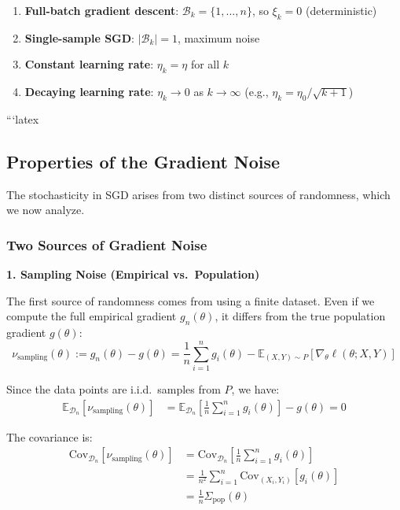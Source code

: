 \documentclass[11pt]{article}
\begin{document}
\begin{enumerate}
    \item \textbf{Full-batch gradient descent}: $\mathcal{B}_k = \{1, ..., n\}$, so $\xi_k = 0$ (deterministic)
    \item \textbf{Single-sample SGD}: $|\mathcal{B}_k| = 1$, maximum noise
    \item \textbf{Constant learning rate}: $\eta_k = \eta$ for all $k$
    \item \textbf{Decaying learning rate}: $\eta_k \to 0$ as $k \to \infty$ (e.g., $\eta_k = \eta_0/\sqrt{k+1}$)
\end{enumerate}

```latex
\subsection{Properties of the Gradient Noise}

The stochasticity in SGD arises from two distinct sources of randomness, which we now analyze.

\subsubsection{Two Sources of Gradient Noise}

\textbf{1. Sampling Noise (Empirical vs.\ Population)}

The first source of randomness comes from using a finite dataset. Even if we compute the full empirical gradient $g_n(\theta)$, it differs from the true population gradient $g(\theta)$:
$$\nu_{\text{sampling}}(\theta) := g_n(\theta) - g(\theta) = \frac{1}{n} \sum_{i=1}^n g_i(\theta) - \mathbb{E}_{(X,Y) \sim P}[\nabla_\theta \ell(\theta; X, Y)]$$

Since the data points are i.i.d.\ samples from $P$, we have:
\begin{align}
\mathbb{E}_{\mathcal{D}_n}[\nu_{\text{sampling}}(\theta)] &= \mathbb{E}_{\mathcal{D}_n}\left[\frac{1}{n} \sum_{i=1}^n g_i(\theta)\right] - g(\theta) = 0
\end{align}

The covariance is:
\begin{align}
\text{Cov}_{\mathcal{D}_n}[\nu_{\text{sampling}}(\theta)] &= \text{Cov}_{\mathcal{D}_n}\left[\frac{1}{n} \sum_{i=1}^n g_i(\theta)\right] \\
&= \frac{1}{n^2} \sum_{i=1}^n \text{Cov}_{(X_i,Y_i)}[g_i(\theta)] \\
&= \frac{1}{n} \Sigma_{\text{pop}}(\theta)
\end{align}
\end{document}
